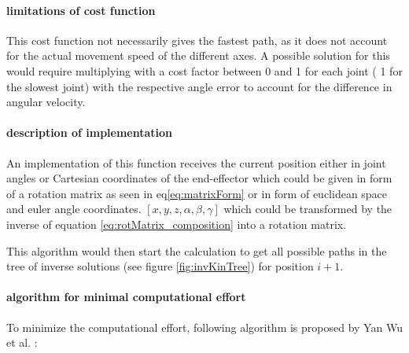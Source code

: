 \paragraph{limitations of cost function}
This cost function not necessarily gives the fastest path, as it does not account for the actual movement speed of the different axes. 
A possible solution for this would require multiplying with a cost factor between 0 and 1 for each joint ( 1 for the slowest joint) with the respective angle error to account for the difference in angular velocity.



\paragraph{description of implementation}

An implementation of this function receives the current position either in joint angles or Cartesian coordinates of the end-effector which could be given in form of a rotation matrix as seen in eq\ref{eq:matrixForm} or in form of euclidean space and euler angle coordinates. $[x,y,z, \alpha, \beta, \gamma]$ which could be transformed by the inverse of equation \ref{eq:rotMatrix_composition} into a rotation matrix.

This algorithm would then start the calculation to get all possible paths in the tree of inverse solutions (see figure \ref{fig:invKinTree}) for position ${i+1}$.

\paragraph{algorithm for minimal computational effort}

To minimize the computational effort, following algorithm is proposed by Yan Wu et al. \cite{invKinSolYanWu}:

